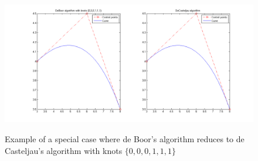 \documentclass[12pt,a4paper]{article}
\begin{document}
\begin{figure}[hbtp]
\caption{Example of a special case where de Boor's algorithm reduces to de Casteljau's algorithm with knots $\{0, 0, 0, 1, 1, 1\}$}
\centering
\includegraphics[width=\textwidth]{DeCastVSDeBoor.png}
\label{fig:3c}
\end{figure}
\end{document}
